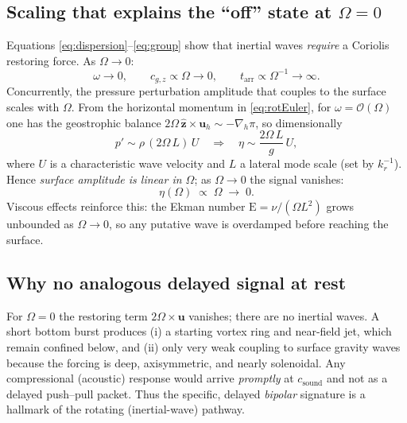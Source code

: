 \documentclass[12pt]{article}
\begin{document}
\subsection{Scaling that explains the ``off'' state at $\Omega=0$}
Equations \eqref{eq:dispersion}--\eqref{eq:group} show that inertial waves \emph{require} a Coriolis restoring force. As $\Omega\to 0$:
\begin{equation}
\omega \to 0,\qquad c_{g,z}\propto \Omega \to 0,\qquad t_{\mathrm{arr}}\propto \Omega^{-1}\to \infty.
\end{equation}
Concurrently, the pressure perturbation amplitude that couples to the surface scales with $\Omega$. From the horizontal momentum in \eqref{eq:rotEuler}, for $\omega=\mathcal{O}(\Omega)$ one has the geostrophic balance $2\Omega\,\hat{\boldsymbol{z}}\times \boldsymbol{u}_h \sim -\nabla_h \pi$, so dimensionally
\begin{equation}
p' \sim \rho\,(2\Omega\,L)\,U \quad \Rightarrow\quad
\eta \sim \frac{2\Omega\,L}{g}\,U,
\label{eq:eta-scale}
\end{equation}
where $U$ is a characteristic wave velocity and $L$ a lateral mode scale (set by $k_r^{-1}$). Hence \emph{surface amplitude is linear in $\Omega$}; as $\Omega\to 0$ the signal vanishes:
\[
\eta(\Omega)\;\propto\;\Omega \;\longrightarrow\; 0.
\]
Viscous effects reinforce this: the Ekman number $\mathrm{E}=\nu/(\Omega L^2)$ grows unbounded as $\Omega\to 0$, so any putative wave is overdamped before reaching the surface.

\subsection{Why no analogous delayed signal at rest}
For $\Omega=0$ the restoring term $2\Omega\times\boldsymbol{u}$ vanishes; there are no inertial waves. A short bottom burst produces (i) a starting vortex ring and near-field jet, which remain confined below, and (ii) only very weak coupling to surface gravity waves because the forcing is deep, axisymmetric, and nearly solenoidal. Any compressional (acoustic) response would arrive \emph{promptly} at $c_{\text{sound}}$ and not as a delayed push--pull packet. Thus the specific, delayed \emph{bipolar} signature is a hallmark of the rotating (inertial-wave) pathway.
\end{document}

